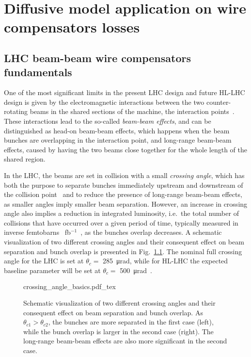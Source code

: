 \chapter{Diffusive model application on wire compensators losses}

\section{LHC beam-beam wire compensators fundamentals}

One of the most significant limits in the present LHC design and future HL-LHC design is given by the electromagnetic interactions between the two counter-rotating beams in the shared sections of the machine, the interaction points~\cite{Arduini_2016}. These interactions lead to the so-called \textit{beam-beam effects}, and can be distinguished as head-on beam-beam effects, which happens when the beam bunches are overlapping in the interaction point, and long-range beam-beam effects, caused by having the two beams close together for the whole length of the shared region.

In the LHC, the beams are set in collision with a small \textit{crossing angle}, which has both the purpose to separate bunches immediately upstream and downstream of the collision point~\cite{Arduini_2016} and to reduce the presence of long-range beam-beam effects, as smaller angles imply smaller beam separation. However, an increase in crossing angle also implies a reduction in integrated luminosity, i.e.\ the total number of collisions that have occurred over a given period of time, typically measured in inverse femtobarns \SI{}{fb}$^{-1}$~\cite{Herr:941318}, as the bunches overlap decreases. A schematic visualization of two different crossing angles and their consequent effect on beam separation and bunch overlap is presented in Fig.~\ref{fig:crossing-angles}. The nominal full crossing angle for the LHC is set at $\theta_c =$ \SI{285}{\micro\radian}, while for HL-LHC the expected baseline parameter will be set at $\theta_c =$ \SI{500}{\micro\radian}~\cite{BejarAlonso:2749422}. 

\begin{figure}[hpt]
    \centering
    \def\svgwidth{1.0\textwidth}
    {crossing_angle_basics.pdf_tex}
    \caption{Schematic visualization of two different crossing angles and their consequent effect on beam separation and bunch overlap. As $\theta_{c1} > \theta_{c2}$, the bunches are more separated in the first case (left), while the bunch overlap is larger in the second case (right). The long-range beam-beam effects are also more significant in the second case.}
    \label{fig:crossing-angles}
\end{figure}

